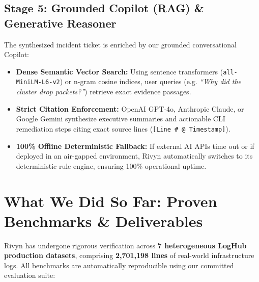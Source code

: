\documentclass[11pt,a4paper]{article}
\begin{document}
\subsection{Stage 5: Grounded Copilot (RAG) \& Generative Reasoner}
The synthesized incident ticket is enriched by our grounded conversational Copilot:
\begin{itemize}[leftmargin=*]
    \item \textbf{Dense Semantic Vector Search:} Using sentence transformers (\texttt{all-MiniLM-L6-v2}) or n-gram cosine indices, user queries (e.g. \textit{``Why did the cluster drop packets?''}) retrieve exact evidence passages.
    \item \textbf{Strict Citation Enforcement:} OpenAI GPT-4o, Anthropic Claude, or Google Gemini synthesize executive summaries and actionable CLI remediation steps citing exact source lines (\texttt{[Line \# @ Timestamp]}).
    \item \textbf{100\% Offline Deterministic Fallback:} If external AI APIs time out or if deployed in an air-gapped environment, Rivyn automatically switches to its deterministic rule engine, ensuring 100\% operational uptime.
\end{itemize}

\newpage

\section{What We Did So Far: Proven Benchmarks \& Deliverables}

Rivyn has undergone rigorous verification across \textbf{7 heterogeneous LogHub production datasets}, comprising \textbf{2,701,198 lines} of real-world infrastructure logs. All benchmarks are automatically reproducible using our committed evaluation suite:
\end{document}
